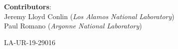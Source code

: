 \thispagestyle{plain}
\maketitle

\begin{center}\large
\textbf{Contributors}: \\
Jeremy Lloyd Conlin (\emph{Los Alamos National Laboratory}) \\
Paul Romano (\emph{Argonne National Laboratory})
\end{center}

\vspace{4in}
\begin{center}
  \Large LA-UR-19-29016
\end{center}


\newpage
\pagestyle{front}
\tableofcontents
\clearpage
\listoftables
\listoftodos
